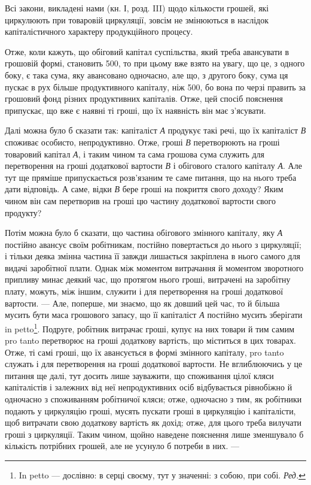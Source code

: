 Всі закони, викладені нами (кн. І, розд. III) щодо кількости грошей,
які циркулюють при товаровій циркуляції, зовсім не змінюються в наслідок
капіталістичного характеру продукційного процесу.

Отже, коли кажуть, що обіговий капітал суспільства, який треба
авансувати в грошовій формі, становить 500, то при цьому вже
взято на увагу, що це, з одного боку, є така сума, яку авансовано одночасно,
але що, з другого боку, сума ця пускає в рух більше продуктивного
капіталу, ніж 500, бо вона по черзі править за грошовий
фонд різних продуктивних капіталів. Отже, цей спосіб пояснення
припускає, що вже є наявні ті гроші, що їх наявність він має з’ясувати.

Далі можна було б сказати так: капіталіст \emph{А} продукує такі речі, що
їх капіталіст \emph{В} споживає особисто, непродуктивно. Отже, гроші \emph{В} перетворюють
на гроші товаровий капітал \emph{А}, і таким чином та сама грошова
сума служить для перетворення на гроші додаткової вартости \emph{В} і
обігового сталого капіталу \emph{А}. Але тут ще пряміше припускається розв’язаним
те саме питання, що на нього треба дати відповідь. А саме, відки
\emph{В} бере гроші на покриття свого доходу? Яким чином він сам перетворив
на гроші цю частину додаткової вартости свого продукту?

Потім можна було б сказати, що частина обігового змінного капіталу,
яку \emph{А} постійно авансує своїм робітникам, постійно повертається до нього
з циркуляції; і тільки деяка змінна частина її завжди лишається закріплена
в нього самого для видачі заробітної плати. Однак між моментом
витрачання й моментом зворотного припливу минає деякий час, що
протягом нього гроші, витрачені на заробітну плату, можуть, між іншим,
служити і для перетворення на гроші додаткової вартости. — Але, поперше,
ми знаємо, що як довший цей час, то й більша мусить бути маса грошового
запасу, що її капіталіст \emph{А} постійно мусить зберігати in petto\footnote*{
In petto — дослівно: в серці своєму, тут у значенні: з собою, при собі. \emph{Ред.}
}.
Подруге, робітник витрачає гроші, купує на них товари й тим самим
pro tanto перетворює на гроші додаткову вартість, що міститься в цих
товарах. Отже, ті самі гроші, що їх авансується в формі змінного капіталу,
pro tanto служать і для перетворення на гроші додаткової вартости.
Не вглиблюючись у це питання ще далі, тут досить лише зауважити, що
споживання цілої кляси капіталістів і залежних від неї непродуктивних
осіб відбувається рівнобіжно й одночасно з споживанням робітничої кляси;
отже, одночасно з тим, як робітники подають у циркуляцію гроші,
мусять пускати гроші в циркуляцію і капіталісти, щоб витрачати свою
додаткову вартість як дохід; отже, для цього треба вилучати гроші з
циркуляції. Таким чином, щойно наведене пояснення лише зменшувало б
кількість потрібних грошей, але не усунуло б потреби в них. —

